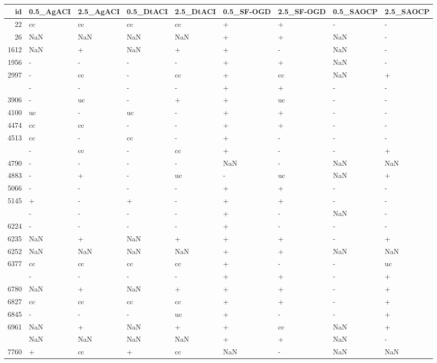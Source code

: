 \documentclass[
]{article}
\begin{document}
\begingroup\fontsize{8}{10}\selectfont

\begin{longtable}[t]{rllllllll}
\toprule
id & 0.5\_AgACI & 2.5\_AgACI & 0.5\_DtACI & 2.5\_DtACI & 0.5\_SF-OGD & 2.5\_SF-OGD & 0.5\_SAOCP & 2.5\_SAOCP\\
\midrule
22 & cc & cc & cc & cc & + & + & - & -\\
26 & NaN & NaN & NaN & NaN & + & + & NaN & -\\
1612 & NaN & + & NaN & + & + & - & NaN & -\\
1956 & - & - & - & - & + & + & NaN & -\\
2997 & - & cc & - & cc & + & cc & NaN & +\\
\addlinespace
3415 & - & - & - & - & + & + & - & -\\
3906 & - & uc & - & + & + & uc & - & -\\
4100 & uc & - & uc & - & + & + & - & -\\
4474 & cc & cc & - & - & + & + & - & -\\
4513 & cc & - & cc & - & + & - & - & -\\
\addlinespace
4596 & - & cc & - & cc & + & - & - & +\\
4790 & - & - & - & - & NaN & - & NaN & NaN\\
4883 & - & + & - & uc & - & uc & NaN & +\\
5066 & - & - & - & - & + & + & - & -\\
5145 & + & - & + & - & + & + & - & -\\
\addlinespace
5602 & - & - & - & - & + & - & NaN & -\\
6224 & - & - & - & - & + & - & - & -\\
6235 & NaN & + & NaN & + & + & + & - & +\\
6252 & NaN & NaN & NaN & NaN & + & + & NaN & NaN\\
6377 & cc & cc & cc & cc & + & - & - & uc\\
\addlinespace
6759 & - & - & - & - & + & + & - & +\\
6780 & NaN & + & NaN & + & + & + & - & +\\
6827 & cc & cc & cc & cc & + & + & - & +\\
6845 & - & - & - & uc & + & - & - & +\\
6961 & NaN & + & NaN & + & + & cc & NaN & +\\
\addlinespace
7719 & NaN & NaN & NaN & NaN & + & + & NaN & -\\
7760 & + & cc & + & cc & NaN & - & NaN & NaN\\

\end{longtable}
\end{document}
